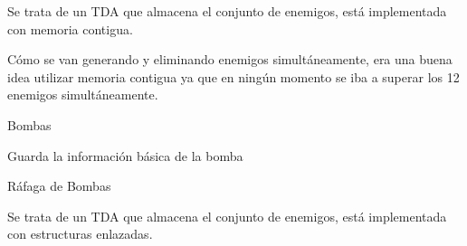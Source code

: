 Se trata de un T\+DA que almacena el conjunto de enemigos, está implementada con memoria contigua.

Cómo se van generando y eliminando enemigos simultáneamente, era una buena idea utilizar memoria contigua ya que en ningún momento se iba a superar los 12 enemigos simultáneamente.


\begin{DoxyEnumerate}
\item Bombas
\end{DoxyEnumerate}

Guarda la información básica de la bomba


\begin{DoxyEnumerate}
\item Ráfaga de Bombas
\end{DoxyEnumerate}

Se trata de un T\+DA que almacena el conjunto de enemigos, está implementada con estructuras enlazadas. 